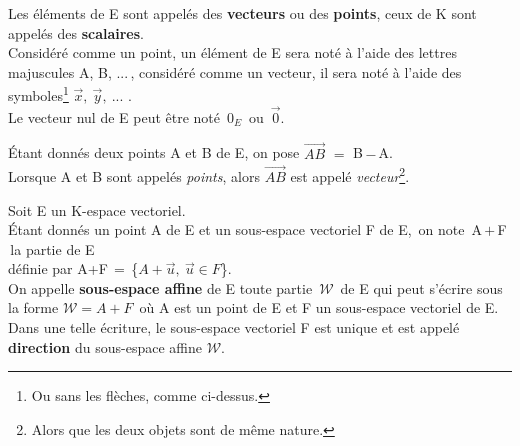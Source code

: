 \vspace{1cm}

\noindent Les éléments de E sont appelés des \textbf{vecteurs} ou des \textbf{points}, ceux de K sont appelés des \textbf{scalaires}.\vspace{0.1cm} \\
Considéré comme un point, un élément de E sera noté à l'aide des lettres majuscules A, B, ...\,, considéré comme un vecteur, il sera noté à l'aide des symboles\footnote{Ou sans les flèches, comme ci-dessus.} \(\vec{x},\ \vec{y},\ \)... . \\
Le vecteur nul de E peut être noté $\,\displaystyle 0_E\,$ ou \(\,\vec{0}\).\vspace{0.3cm}

\noindent Étant donnés deux points A et B de E, on pose \(\overrightarrow{AB}\) $=$ B\,$-$\,A.\vspace{0.1cm}\\
Lorsque A et B sont appelés \emph{points}, alors \(\overrightarrow{AB}\) est appelé \emph{vecteur}\footnote{Alors que les deux objets sont de même nature.}.

\vspace{1.6cm}

Soit E un K-espace vectoriel.\vspace{0.1cm} \\
\noindent Étant donnés un point A de E et un sous-espace vectoriel F de E, \,on note\, A\,$+$\,F \,la partie de E\vspace{0.1cm}\\
définie par A+F\,$=$\,\{\(A+\vec{u},\ \vec{u}\in F \)\}.\vspace{0.3cm} \\
On appelle \textbf{sous-espace affine} de E toute partie \(\,\mathcal{W}\,\) de E qui peut s'écrire sous la forme \(\mathcal{W}=A+F\,\) où A est un point de E et F un sous-espace vectoriel de E.\vspace{0.1cm} \\
Dans une telle écriture, le sous-espace vectoriel F est unique et est appelé \textbf{direction} du sous-espace affine \(\mathcal{W}\).

\newpage


